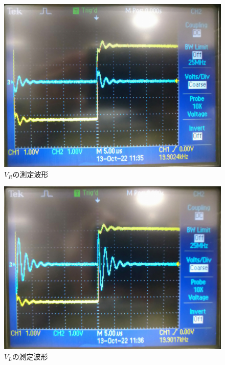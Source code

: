 \begin{figure}[H]
    \begin{center}
        \includegraphics[keepaspectratio, scale=0.3]{DSC_0239.pdf}
        \caption{$V_R$の測定波形}
    \end{center}
\end{figure}

\begin{figure}[H]
    \begin{center}
        \includegraphics[keepaspectratio, scale=0.3]{DSC_0240.pdf}
        \caption{$V_L$の測定波形}
    \end{center}
\end{figure}